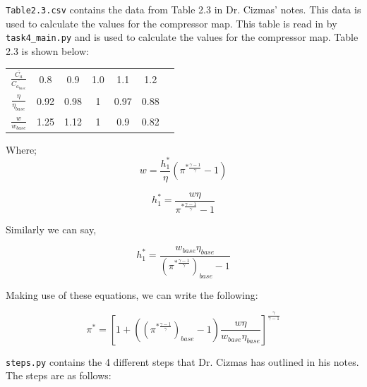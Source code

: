 \documentclass[titlepage]{article}
\begin{document}
\vspace*{3pt}

\verb|Table2.3.csv| contains the data from Table 2.3 in Dr. Cizmas' notes. This data is used to calculate the values for the compressor map. This table is read in by \verb|task4_main.py| and is used to calculate the values for the compressor map. Table 2.3 is shown below:

\begin{center}
    \begin{tabular}{ c c c c c c c }
     $\frac{\bar{C_{a}}}{\bar{C_{a_{base}}}}$ & 0.8 & 0.9 & 1.0 & 1.1 & 1.2 \\ 
        $\frac{\eta}{\eta_{base}}$ & 0.92 & 0.98 & 1 & 0.97 & 0.88 \\
        $\frac{w}{w_{base}}$ & 1.25 & 1.12 & 1 & 0.9 & 0.82 \\ 
    \end{tabular}
    \end{center}

\vspace*{3pt}

Where;
\begin{equation}
    w = \frac{h^{*}_{1}}{\eta} (\pi^{* \frac{\gamma - 1}{\gamma}} - 1)
\end{equation}

\vspace*{3pt}

\begin{equation}
    h^{*}_{1} = \frac{w \eta}{\pi^{* \frac{\gamma - 1}{\gamma}} - 1}
\end{equation}

\vspace*{3pt}

Similarly we can say,

\begin{equation}
    h^{*}_{1} = \frac{w_{base} \eta_{base}}{(\pi^{* \frac{\gamma-1}{\gamma}})_{base} - 1}
\end{equation}

\vspace*{3pt}

Making use of these equations, we can write the following:

\begin{equation}
    \pi^{ * } = \left[ 1 + ((\pi^{ * \frac{\gamma - 1}{\gamma}})_{base} -1) \frac{w \eta}{w_{base} \eta_{base}} \right] ^{\frac{\gamma}{\gamma - 1}}
\end{equation}

\verb|steps.py| contains the 4 different steps that Dr. Cizmas has outlined in his notes. The steps are as follows:
\end{document}
